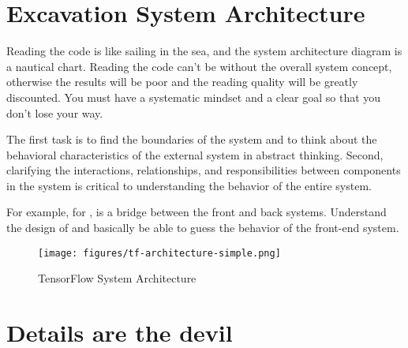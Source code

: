 \section{Excavation System Architecture}

\begin{content}

Reading the code is like sailing in the sea, and the system architecture diagram is a nautical chart. Reading the code can't be without the overall system concept, otherwise the results will be poor and the reading quality will be greatly discounted. You must have a systematic mindset and a clear goal so that you don't lose your way.

The first task is to find the boundaries of the system and to think about the behavioral characteristics of the external system in abstract thinking. Second, clarifying the interactions, relationships, and responsibilities between components in the system is critical to understanding the behavior of the entire system.

For example, for ,  is a bridge between the front and back systems. Understand the design of  and basically be able to guess the behavior of the front-end system.

\begin{figure}[!h]
\centering
\texttt{[image: figures/tf-architecture-simple.png]}
\caption{TensorFlow System Architecture}
 \label{fig:tf-architecture-simple}
\end{figure}

\end{content}

\section{Details are the devil}

